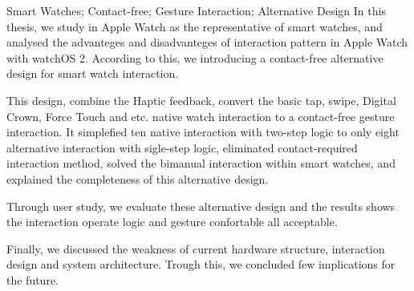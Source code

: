 
\begin{abstract}{智能手表；非接触式；手势交互；备择设计}


本文以现有智能手表产品的代表 Apple Watch 为例，对 Apple Watch 上的交互模式的优缺点进行了全面的分析，并据此给出了一套非接触式的备择设计。其配合了 Haptic Engine 对用户的直观震动反馈，完成了对基础点按、滑动、Digital Crown、Force Touch等系列原生交互的非接触式手势交互设计，此设计将嵌套两步逻辑的十种原生交互简化为了单步逻辑上的八种备择交互，且消除了接触式交互的依赖，解决了现有交互中对双手依赖的缺陷，并同时说明了给出的备择设计的交互完备性。通过用户调研，对本套交互方式的设计进行了评估，结果显示该方案的操作逻辑和舒适度良好。在最后，本文对设计的硬件结构、交互方式和系统架构的现有缺陷进行了讨论，并从中得到的启示，给出了可行的解决思路。
\end{abstract}
\cleardoublepage
{} %
\begin{abstractEng}{Smart Watches; Contact-free; Gesture Interaction; Alternative Design}
In this thesis, we study in Apple Watch as the representative of smart watches, and analysed the advanteges and disadvanteges of interaction pattern in Apple Watch with watchOS 2. According to this, we introducing a contact-free alternative design for smart watch interaction.

This design, combine the Haptic feedback, convert the basic tap, swipe, Digital Crown, Force Touch and etc. native watch interaction to a contact-free gesture interaction. It simplefied ten native interaction with two-step logic to only eight alternative interaction with sigle-step logic, eliminated contact-required interaction method, solved the bimanual interaction within smart watches, and explained the completeness of this alternative design.

Through user study, we evaluate these alternative design and the results shows  the interaction operate logic and gesture confortable all acceptable.

Finally, we discussed the weakness of current hardware structure, interaction design and system architecture. Trough this, we concluded few implications for the future.
\end{abstractEng}
